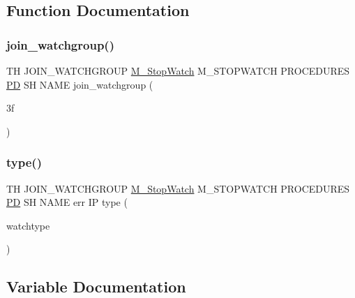 \subsection{Function Documentation}
\mbox{\label{join__watchgroup_83_8txt_ac3b8dababa54df484eadaefd83766987}} 
\subsubsection{\texorpdfstring{join\+\_\+watchgroup()}{join\_watchgroup()}}
{\footnotesize\ttfamily TH J\+O\+I\+N\+\_\+\+W\+A\+T\+C\+H\+G\+R\+O\+UP \hyperlink{option__stopwatch_83_8txt_aa2011fc45a5e502e87ee50996a8a9305}{M\+\_\+\+Stop\+Watch} M\+\_\+\+S\+T\+O\+P\+W\+A\+T\+CH P\+R\+O\+C\+E\+D\+U\+R\+ES \hyperlink{what__overview_81_8txt_a85f26da5a4481fbdb0d9c79f2b94de3e}{PD} SH N\+A\+ME join\+\_\+watchgroup (\begin{DoxyParamCaption}\item[{3f}]{ }\end{DoxyParamCaption})}

\mbox{\label{join__watchgroup_83_8txt_a88f3702cb290b5d675ea8ffcbe5d0048}} 
\subsubsection{\texorpdfstring{type()}{type()}}
{\footnotesize\ttfamily TH J\+O\+I\+N\+\_\+\+W\+A\+T\+C\+H\+G\+R\+O\+UP \hyperlink{option__stopwatch_83_8txt_aa2011fc45a5e502e87ee50996a8a9305}{M\+\_\+\+Stop\+Watch} M\+\_\+\+S\+T\+O\+P\+W\+A\+T\+CH P\+R\+O\+C\+E\+D\+U\+R\+ES \hyperlink{what__overview_81_8txt_a85f26da5a4481fbdb0d9c79f2b94de3e}{PD} SH N\+A\+ME err IP type (\begin{DoxyParamCaption}\item[{watchtype}]{ }\end{DoxyParamCaption})}



\subsection{Variable Documentation}
\mbox{\label{join__watchgroup_83_8txt_a85bcd8db808fcc8cfc2b3e95e1e7d847}} 
